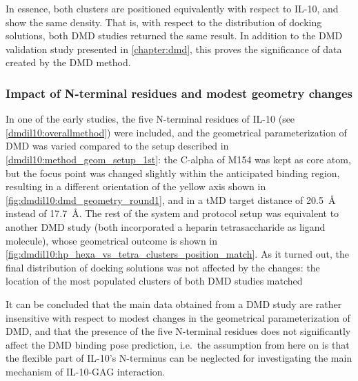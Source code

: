 In essence, both clusters are positioned equivalently with respect to IL-10, and
show the same density. That is, with respect to the distribution of docking
solutions, both DMD studies returned the same result. In addition to the DMD
validation study presented in \cref{chapter:dmd}, this proves the significance
of data created by the DMD method.


\subsubsection{Impact of N-terminal residues and modest geometry changes}

In one of the early studies, the five N-terminal residues of IL-10 (see
\ref{dmdil10:overallmethod}) were included, and the geometrical parameterization
of DMD was varied compared to the setup described in
\ref{dmdil10:method_geom_setup_1st}: the C-alpha of M154 was kept as core atom, but
the focus point was changed slightly within the anticipated binding region,
resulting in a different orientation of the yellow axis shown in
\cref{fig:dmdil10:dmd_geometry_round1}, and in a tMD target distance of
\SI{20.5}{\angstrom} instead of \SI{17.7}{\angstrom}. The rest of the system and
protocol setup was equivalent to another DMD study (both incorporated a heparin
tetrasaccharide as ligand molecule), whose geometrical outcome is shown in
\cref{fig:dmdil10:hp_hexa_vs_tetra_clusters_position_match}. As it turned out,
the final distribution of docking solutions was not affected by the changes: the
location of the most populated clusters of both DMD studies matched


It can be concluded that the main data obtained from a DMD study are rather
insensitive with respect to modest changes in the geometrical parameterization
of DMD, and that the presence of the five N-terminal residues does not
significantly affect the DMD binding pose prediction, i.e.\ the assumption from
here on is that the flexible part of IL-10's N-terminus can be neglected for
investigating the main mechanism of IL-10-GAG interaction.


